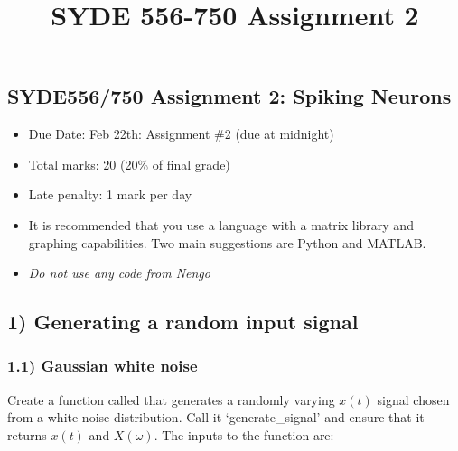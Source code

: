 \documentclass{article}
\title{SYDE 556-750 Assignment 2}
\providecommand{\tightlist}{%
      \setlength{\itemsep}{0pt}\setlength{\parskip}{0pt}}
\begin{document}
    
    
    \maketitle
    
    

    
    \subsection{SYDE556/750 Assignment 2: Spiking
Neurons}\label{syde556750-assignment-2-spiking-neurons}

\begin{itemize}
\tightlist
\item
  Due Date: Feb 22th: Assignment \#2 (due at midnight)
\item
  Total marks: 20 (20\% of final grade)
\item
  Late penalty: 1 mark per day
\item
  It is recommended that you use a language with a matrix library and
  graphing capabilities. Two main suggestions are Python and MATLAB.
\item
  \emph{Do not use any code from Nengo}
\end{itemize}

    \subsection{1) Generating a random input
signal}\label{generating-a-random-input-signal}

\subsubsection{1.1) Gaussian white noise}\label{gaussian-white-noise}

Create a function called that generates a randomly varying \(x(t)\)
signal chosen from a white noise distribution. Call it
`generate\_signal' and ensure that it returns \(x(t)\) and
\(X(\omega)\). The inputs to the function are:
\end{document}
